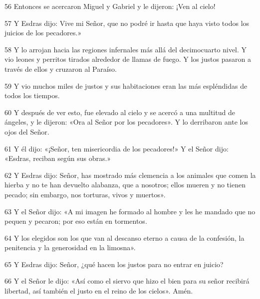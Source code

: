 \par 56 Entonces se acercaron Miguel y Gabriel y le dijeron: ¡Ven al cielo!

\par 57 Y Esdras dijo: Vive mi Señor, que no podré ir hasta que haya visto todos los juicios de los pecadores.»

\par 58 Y lo arrojan hacia las regiones infernales más allá del decimocuarto nivel. Y vio leones y perritos tirados alrededor de llamas de fuego. Y los justos pasaron a través de ellos y cruzaron al Paraíso.

\par 59 Y vio muchos miles de justos y sus habitaciones eran las más espléndidas de todos los tiempos.

\par 60 Y después de ver esto, fue elevado al cielo y se acercó a una multitud de ángeles, y le dijeron: «Ora al Señor por los pecadores». Y lo derribaron ante los ojos del Señor.

\par 61 Y él dijo: «¡Señor, ten misericordia de los pecadores!» Y el Señor dijo: «Esdras, reciban según sus obras.»

\par 62 Y Esdras dijo: Señor, has mostrado más clemencia a los animales que comen la hierba y no te han devuelto alabanza, que a nosotros; ellos mueren y no tienen pecado; sin embargo, nos torturas, vivos y muertos».

\par 63 Y el Señor dijo: «A mi imagen he formado al hombre y les he mandado que no pequen y pecaron; por eso están en tormentos.

\par 64 Y los elegidos son los que van al descanso eterno a causa de la confesión, la penitencia y la generosidad en la limosna».

\par 65 Y Esdras dijo: Señor, ¿qué hacen los justos para no entrar en juicio?

\par 66 Y el Señor le dijo: «Así como el siervo que hizo el bien para su señor recibirá libertad, así también el justo en el reino de los cielos». Amén.

